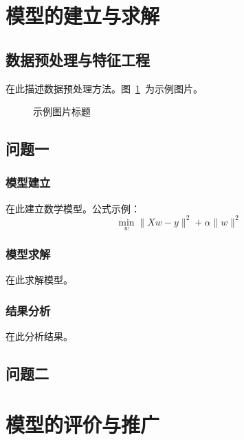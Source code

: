 \documentclass[12pt,a4paper]{article}
\begin{document}
\section{模型的建立与求解}

\subsection{数据预处理与特征工程}

在此描述数据预处理方法。图~\ref{fig:example}~为示例图片。

\begin{figure}[htbp]\centering
  \caption{示例图片标题}
  \label{fig:example}
\end{figure}

\subsection{问题一}

\subsubsection{模型建立}

在此建立数学模型。公式示例：
\begin{equation}
  \min_w \|Xw - y\|^2 + \alpha\|w\|^2
\end{equation}

\subsubsection{模型求解}

在此求解模型。

\subsubsection{结果分析}

在此分析结果。

\subsection{问题二}


\section{模型的评价与推广}
\end{document}

